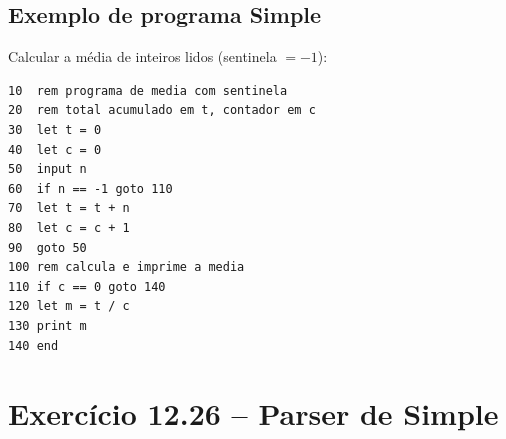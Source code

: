 \documentclass[12pt,a4paper]{article}
\begin{document}
\subsection*{Exemplo de programa Simple}

\begin{respostabox}
Calcular a média de inteiros lidos (sentinela $= -1$):

\begin{lstlisting}
10  rem programa de media com sentinela
20  rem total acumulado em t, contador em c
30  let t = 0
40  let c = 0
50  input n
60  if n == -1 goto 110
70  let t = t + n
80  let c = c + 1
90  goto 50
100 rem calcula e imprime a media
110 if c == 0 goto 140
120 let m = t / c
130 print m
140 end
\end{lstlisting}
\end{respostabox}

\newpage

\section{Exercício 12.26 -- Parser de Simple}
\end{document}
